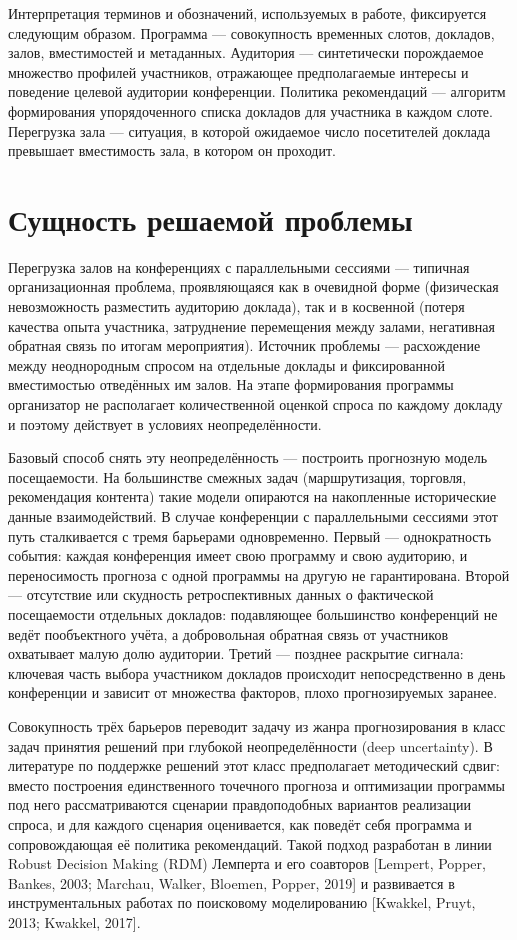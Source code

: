 Интерпретация терминов и обозначений, используемых в работе, фиксируется следующим образом. Программа --- совокупность временных слотов, докладов, залов, вместимостей и метаданных. Аудитория --- синтетически порождаемое множество профилей участников, отражающее предполагаемые интересы и поведение целевой аудитории конференции. Политика рекомендаций --- алгоритм формирования упорядоченного списка докладов для участника в каждом слоте. Перегрузка зала --- ситуация, в которой ожидаемое число посетителей доклада превышает вместимость зала, в котором он проходит.


\section{Сущность решаемой проблемы}

Перегрузка залов на конференциях с параллельными сессиями --- типичная организационная проблема, проявляющаяся как в очевидной форме (физическая невозможность разместить аудиторию доклада), так и в косвенной (потеря качества опыта участника, затруднение перемещения между залами, негативная обратная связь по итогам мероприятия). Источник проблемы --- расхождение между неоднородным спросом на отдельные доклады и фиксированной вместимостью отведённых им залов. На этапе формирования программы организатор не располагает количественной оценкой спроса по каждому докладу и поэтому действует в условиях неопределённости.

Базовый способ снять эту неопределённость --- построить прогнозную модель посещаемости. На большинстве смежных задач (маршрутизация, торговля, рекомендация контента) такие модели опираются на накопленные исторические данные взаимодействий. В случае конференции с параллельными сессиями этот путь сталкивается с тремя барьерами одновременно. Первый --- однократность события: каждая конференция имеет свою программу и свою аудиторию, и переносимость прогноза с одной программы на другую не гарантирована. Второй --- отсутствие или скудность ретроспективных данных о фактической посещаемости отдельных докладов: подавляющее большинство конференций не ведёт пообъектного учёта, а добровольная обратная связь от участников охватывает малую долю аудитории. Третий --- позднее раскрытие сигнала: ключевая часть выбора участником докладов происходит непосредственно в день конференции и зависит от множества факторов, плохо прогнозируемых заранее.

Совокупность трёх барьеров переводит задачу из жанра прогнозирования в класс задач принятия решений при глубокой неопределённости (deep uncertainty). В литературе по поддержке решений этот класс предполагает методический сдвиг: вместо построения единственного точечного прогноза и оптимизации программы под него рассматриваются сценарии правдоподобных вариантов реализации спроса, и для каждого сценария оценивается, как поведёт себя программа и сопровождающая её политика рекомендаций. Такой подход разработан в линии Robust Decision Making (RDM) Лемперта и его соавторов [Lempert, Popper, Bankes, 2003; Marchau, Walker, Bloemen, Popper, 2019] и развивается в инструментальных работах по поисковому моделированию [Kwakkel, Pruyt, 2013; Kwakkel, 2017].

